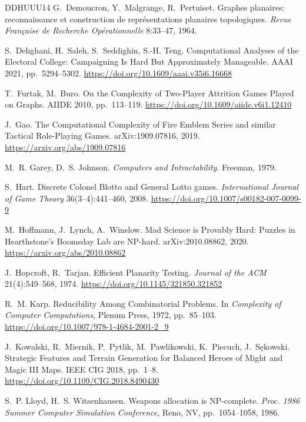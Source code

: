 \documentclass[11pt,a4paper]{article}
\theoremstyle{plain}
\theoremstyle{definition}
\theoremstyle{plain}
\theoremstyle{definition}
\theoremstyle{remark}
\begin{document}
\begin{thebibliography}{DDHUUU14}
 G.~Demoucron, Y.~Malgrange, R.~Pertuiset. Graphes planaires: reconnaissance
et construction de repr\'esentations planaires topologiques. \emph{Revue Fran\c{c}aise de
Recherche Op\'erationnelle} 8:33--47, 1964.

 S.~Dehghani, H.~Saleh, S.~Seddighin, S.-H. Teng. Computational Analyses
of the Electoral College: Campaigning Is Hard But Approximately Manageable. AAAI 2021, pp.~5294--5302.
\url{https://doi.org/10.1609/aaai.v35i6.16668}

 T.~Furtak, M.~Buro. On the Complexity of Two-Player Attrition Games Played on
Graphs. AIIDE 2010, pp.~113--119. \url{https://doi.org/10.1609/aiide.v6i1.12410}

 J.~Gao. The Computational Complexity of Fire Emblem Series and similar
Tactical Role-Playing Games. arXiv:1909.07816, 2019. \url{https://arxiv.org/abs/1909.07816}

 M.~R. Garey, D.~S. Johnson. \emph{Computers and Intractability}.
Freeman, 1979.

 S.~Hart. Discrete Colonel Blotto and General Lotto games.
\emph{International Journal of Game Theory} 36(3--4):441--460, 2008.
\url{https://doi.org/10.1007/s00182-007-0099-9}

 M.~Hoffmann, J.~Lynch, A.~Winslow. Mad Science is Provably Hard: Puzzles in
Hearthstone's Boomsday Lab are NP-hard. arXiv:2010.08862, 2020.
\url{https://arxiv.org/abs/2010.08862}

 J.~Hopcroft, R.~Tarjan. Efficient Planarity Testing. \emph{Journal of the
ACM} 21(4):549--568, 1974. \url{https://doi.org/10.1145/321850.321852}

 R.~M. Karp. Reducibility Among Combinatorial Problems.
In \emph{Complexity of Computer Computations}, Plenum Press, 1972, pp.~85--103.
\url{https://doi.org/10.1007/978-1-4684-2001-2_9}

 J.~Kowalski, R.~Miernik, P.~Pytlik, M.~Pawlikowski, K.~Piecuch,
J.~S\k{e}kowski. Strategic Features and Terrain Generation for Balanced Heroes of Might and
Magic III Maps. IEEE CIG 2018, pp.~1--8.
\url{https://doi.org/10.1109/CIG.2018.8490430}

 S.~P. Lloyd, H.~S. Witsenhausen. Weapons allocation is NP-complete.
\emph{Proc. 1986 Summer Computer Simulation Conference}, Reno, NV, pp.~1054--1058, 1986.


\end{thebibliography}
\end{document}
